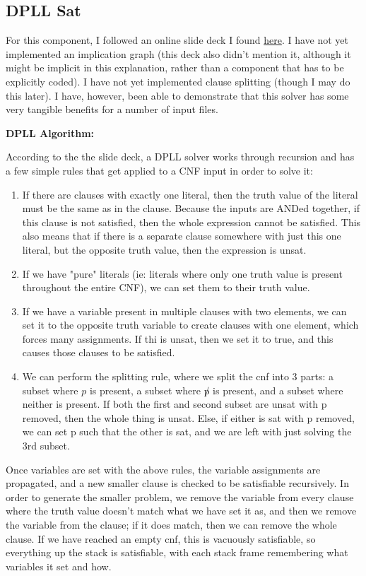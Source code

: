 \documentclass[11pt]{article}
\begin{document}
\begin{flushleft}
\section{DPLL Sat} For this component, I followed an online slide deck I found \href{http://profs.sci.univr.it/~farinelli/courses/ar/slides/DPLL.pdf}{here}. I have not yet implemented an implication graph (this deck also didn't mention it, although it might be implicit in this explanation, rather than a component that has to be explicitly coded). I have not yet implemented clause splitting (though I may do this later). I have, however, been able to demonstrate that this solver has some very tangible benefits for a number of input files.\bigskip

{\bf{DPLL Algorithm:}}\medskip

According to the the slide deck, a DPLL solver works through recursion and has a few simple rules that get applied to a CNF input in order to solve it:
\begin{enumerate}
\item If there are clauses with exactly one literal, then the truth value of the literal must be the same as in the clause. Because the inputs are ANDed together, if this clause is not satisfied, then the whole expression cannot be satisfied. This also means that if there is a separate clause somewhere with just this one literal, but the opposite truth value, then the expression is unsat.
\item If we have "pure" literals (ie: literals where only one truth value is present throughout the entire CNF), we can set them to their truth value.
\item If we have a variable present in multiple clauses with two elements, we can set it to the opposite truth variable to create clauses with one element, which forces many assignments. If thi is unsat, then we set it to true, and this causes those clauses to be satisfied.
\item We can perform the splitting rule, where we split the cnf into 3 parts: a subset where $p$ is present, a subset where $\not p$ is present, and a subset where neither is present. If both the first and second subset are unsat with p removed, then the whole thing is unsat. Else, if either is sat with p removed, we can set p such that the other is sat, and we are left with just solving the 3rd subset.
\end{enumerate}
Once variables are set with the above rules, the variable assignments are propagated, and a new smaller clause is checked to be satisfiable recursively. In order to generate the smaller problem, we remove the variable from every clause where the truth value doesn't match what we have set it as, and then we remove the variable from the clause; if it does match, then we can remove the whole clause. If we have reached an empty cnf, this is vacuously satisfiable, so everything up the stack is satisfiable, with each stack frame remembering what variables it set and how.\bigskip


\end{flushleft}
\end{document}
